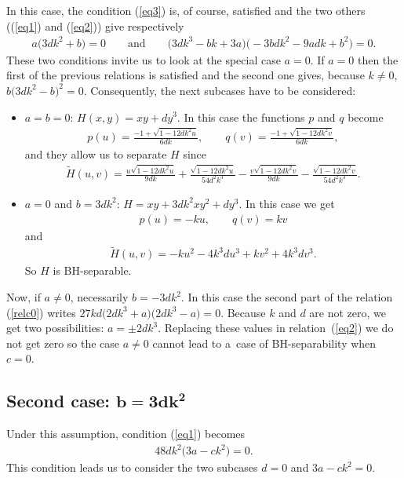 \documentclass[10pt,a4paper]{amsart}
\numberwithin{equation}{section}
\begin{document}
In this case, the condition (\ref{eq3}) is, of course, satisfied and the two others ((\ref{eq1}) and (\ref{eq2})) give respectively
\begin{gather}\label{relc0}
a\big(3dk^2+b\big)=0\qquad \text{and}\qquad \big(3dk^3-bk+3a\big)\big({-}3bdk^2-9adk+b^2\big)=0.
\end{gather}
These two conditions invite us to look at the special case $a=0$. If $a=0$ then the first of the previous relations is satisfied and the second one gives, because $k\not=0$, $b\big(3dk^2-b\big)^2=0$. Consequently, the next subcases have to be considered:
\begin{itemize}\itemsep=0pt

\item $a=b=0$: $H(x,y)=xy+dy^3$.
In this case the functions $p$ and $q$ become
\begin{gather*}
p(u)=\frac{-1+\sqrt{1-12dk^2u}}{6dk},\qquad q(v)=\frac{-1+\sqrt{1-12dk^2v}}{6dk},
\end{gather*}
and they allow us to separate $H$ since
\begin{gather*}
\widetilde{H}(u,v)=\frac{u\sqrt{1-12dk^2u}}{9dk} +\frac{\sqrt{1-12dk^2u}}{54d^2k^3}-\frac{v\sqrt{1-12dk^2v}}{9dk}-\frac{\sqrt{1-12dk^2v}}{54d^2k^3}.
\end{gather*}

\item $a=0$ and $b=3dk^2$: $H=xy+3dk^2xy^2+dy^3$.
In this case we get
\begin{gather*}
p(u)=-ku,\qquad q(v)=kv
\end{gather*}
and
\begin{gather*}
\widetilde{H}(u,v)=-ku^2-4k^3du^3+kv^2+4k^3dv^3.
\end{gather*}
So $H$ is BH-separable.
\end{itemize}

Now, if $a\not=0$, necessarily $b=-3dk^2$. In this case the second part of the relation (\ref{relc0}) writes $27kd\big(2dk^3+a\big)\big(2dk^3-a\big)=0$. Because $k$ and $d$ are not zero, we get two possibilities: $a=\pm2dk^3$. Replacing these values in relation~(\ref{eq2}) we do not get zero so the case $a\not=0$ cannot lead to a~case of BH-separability when $c=0$.

\subsection*{Second case: $\boldsymbol{b=3dk^2}$}

Under this assumption, condition (\ref{eq1}) becomes
\begin{gather*}%
48dk^2\big(3a-ck^2\big)=0.
\end{gather*}
This condition leads us to consider the two subcases $d=0$ and $3a-ck^2=0$.
\end{document}
